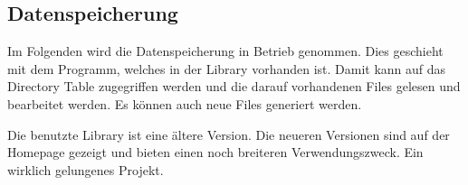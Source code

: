 \newpage
\subsection{Datenspeicherung}
\label{sec:Inbetriebnahme_Datenspeicherung}

Im Folgenden wird die Datenspeicherung in Betrieb genommen. Dies geschieht mit dem Programm, welches in der Library vorhanden ist. Damit kann auf das Directory Table zugegriffen werden und die darauf vorhandenen Files gelesen und bearbeitet werden. Es können auch neue Files generiert werden.


Die benutzte Library ist eine ältere Version. Die neueren Versionen sind auf der Homepage gezeigt und bieten einen noch breiteren Verwendungszweck. Ein wirklich gelungenes Projekt. \cite{dharmani_sdsdhc_2009}